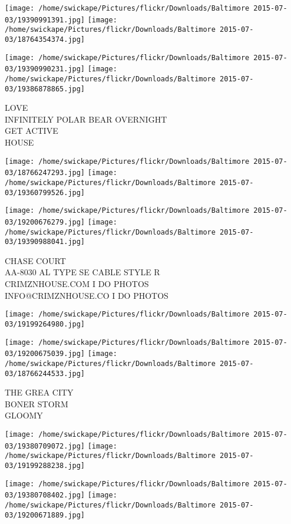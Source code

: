 \documentclass[10pt,letterpaper]{article}
\begin{document}
\texttt{[image: /home/swickape/Pictures/flickr/Downloads/Baltimore 2015-07-03/19390991391.jpg]}
\texttt{[image: /home/swickape/Pictures/flickr/Downloads/Baltimore 2015-07-03/18764354374.jpg]}

\texttt{[image: /home/swickape/Pictures/flickr/Downloads/Baltimore 2015-07-03/19390990231.jpg]}
\texttt{[image: /home/swickape/Pictures/flickr/Downloads/Baltimore 2015-07-03/19386878865.jpg]}

LOVE\\
INFINITELY POLAR BEAR OVERNIGHT\\
GET ACTIVE\\
HOUSE
\pagebreak

\texttt{[image: /home/swickape/Pictures/flickr/Downloads/Baltimore 2015-07-03/18766247293.jpg]}
\texttt{[image: /home/swickape/Pictures/flickr/Downloads/Baltimore 2015-07-03/19360799526.jpg]}

\texttt{[image: /home/swickape/Pictures/flickr/Downloads/Baltimore 2015-07-03/19200676279.jpg]}
\texttt{[image: /home/swickape/Pictures/flickr/Downloads/Baltimore 2015-07-03/19390988041.jpg]}

CHASE COURT\\
AA{-}8030 AL TYPE SE CABLE STYLE R\\
CRIMZNHOUSE.COM I DO PHOTOS\\
INFO@CRIMZNHOUSE.CO I DO PHOTOS
\pagebreak

\texttt{[image: /home/swickape/Pictures/flickr/Downloads/Baltimore 2015-07-03/19199264980.jpg]}

\vspace{0.25in}
\texttt{[image: /home/swickape/Pictures/flickr/Downloads/Baltimore 2015-07-03/19200675039.jpg]}
\texttt{[image: /home/swickape/Pictures/flickr/Downloads/Baltimore 2015-07-03/18766244533.jpg]}

THE GREA CITY\\
BONER STORM\\
GLOOMY
\pagebreak

\texttt{[image: /home/swickape/Pictures/flickr/Downloads/Baltimore 2015-07-03/19380709072.jpg]}
\texttt{[image: /home/swickape/Pictures/flickr/Downloads/Baltimore 2015-07-03/19199288238.jpg]}

\texttt{[image: /home/swickape/Pictures/flickr/Downloads/Baltimore 2015-07-03/19380708402.jpg]}
\texttt{[image: /home/swickape/Pictures/flickr/Downloads/Baltimore 2015-07-03/19200671889.jpg]}
\end{document}
